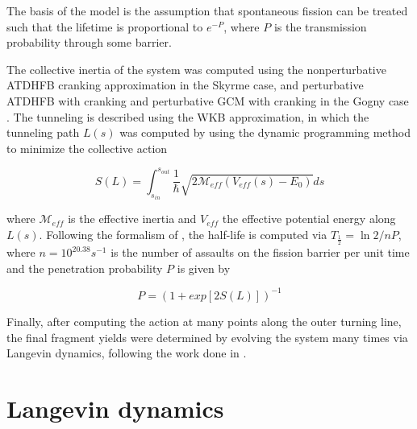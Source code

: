 The basis of the model is the assumption that spontaneous fission can be treated such that the lifetime is proportional to $e^{-P}$, where $P$ is the transmission probability through some barrier.

The collective inertia of the system was computed using the nonperturbative ATDHFB cranking approximation in the Skyrme case, and perturbative ATDHFB with cranking and perturbative GCM with cranking in the Gogny case \cite{Baran2011}. The tunneling is described using the WKB approximation, in which the tunneling path $L(s)$ was computed by using the dynamic programming method to minimize the collective action

\begin{equation}
S(L) = \int_{s_{in}}^{s_{out}} \frac{1}{\hbar}\sqrt{2\mathcal{M}_{eff}\left(V_{eff}(s)-E_0\right)}ds
\end{equation}

\noindent where $\mathcal{M}_{eff}$ is the effective inertia and $V_{eff}$ the effective potential energy along $L(s)$. Following the formalism of \cite{Sadhukhan2013}, the half-life is computed via $T_{\frac{1}{2}} = \ln 2/nP$, where $n=10^{20.38}s^{-1}$ is the number of assaults on the fission barrier per unit time and the penetration probability $P$ is given by

\begin{equation}
P = (1 + exp[2S(L)])^{-1}
\end{equation}

\noindent Finally, after computing the action at many points along the outer turning line, the final fragment yields were determined by evolving the system many times via Langevin dynamics, following the work done in \cite{Sadhukhan2016}.

\section{Langevin dynamics}
